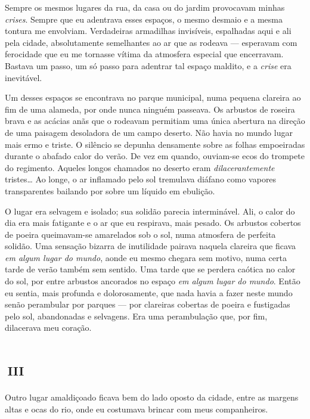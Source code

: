 Sempre os mesmos lugares da rua, da casa ou do jardim provocavam minhas \textit{crises}. Sempre que eu adentrava esses espaços, o mesmo desmaio e a mesma tontura me envolviam. Verdadeiras armadilhas invisíveis, espalhadas aqui e ali pela cidade, absolutamente semelhantes ao ar que as rodeava --- esperavam com ferocidade que eu me tornasse vítima da atmosfera especial que encerravam. Bastava um passo, um só passo para adentrar tal espaço maldito, e a \textit{crise} era inevitável.

Um desses espaços se encontrava no parque municipal, numa pequena clareira ao fim de uma alameda, por onde nunca ninguém passeava. Os arbustos de roseira brava e as acácias anãs que o rodeavam permitiam uma única abertura na direção de uma paisagem desoladora de um campo deserto. Não havia no mundo lugar mais ermo e triste. O silêncio se depunha densamente sobre as folhas empoeiradas durante o abafado calor do verão. De vez em quando, ouviam-se ecos do trompete do regimento. Aqueles longos chamados no deserto eram \textit{dilacerantemente} tristes\ldots{} Ao longe, o ar inflamado pelo sol tremulava diáfano como vapores transparentes bailando por sobre um líquido em ebulição.

O lugar era selvagem e isolado; sua solidão parecia interminável. Ali, o calor do dia era mais fatigante e o ar que eu respirava, mais pesado. Os arbustos cobertos de poeira queimavam-se amarelados sob o sol, numa atmosfera de perfeita solidão. Uma sensação bizarra de inutilidade pairava naquela clareira que ficava \textit{em algum lugar do mundo}, aonde eu mesmo chegara sem motivo, numa certa tarde de verão também sem sentido. Uma tarde que se perdera caótica no calor do sol, por entre arbustos ancorados no espaço \textit{em algum lugar do mundo}. Então eu sentia, mais profunda e dolorosamente, que nada havia a fazer neste mundo senão perambular por parques --- por clareiras cobertas de poeira e fustigadas pelo sol, abandonadas e selvagens. Era uma perambulação que, por fim, dilacerava meu coração.


\chapter*{\small{}\,\Large\centering\textsc{iii}\,\small{}}

Outro lugar amaldiçoado ficava bem do lado oposto da cidade, entre as margens altas e ocas do rio, onde eu costumava brincar com meus companheiros.

